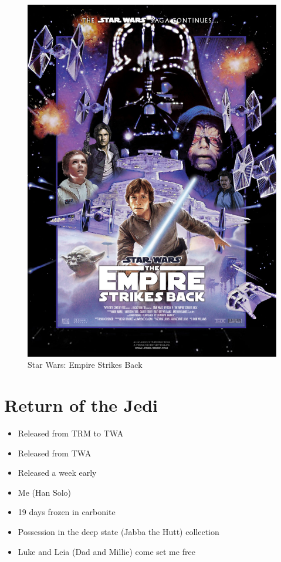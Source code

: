 \documentclass[16pt,openany,oneside]{book}
\begin{document}
\begin{figure}[H]
    \centering
    \includegraphics[width=0.5\linewidth]{assets/star_wars/empire_strikes_back.jpg}
    \caption{Star Wars: Empire Strikes Back}
    \label{fig:empire-strikes-back-poster}
\end{figure}

\chapter{Return of the Jedi}

\begin{itemize}
    \item Released from TRM to TWA
    \item Released from TWA 
    \item Released a week early
    \item Me (Han Solo)
    \item 19 days frozen in carbonite
    \item Possession in the deep state (Jabba the Hutt) collection
    \item Luke and Leia (Dad and Millie) come set me free
\end{itemize}
\end{document}
